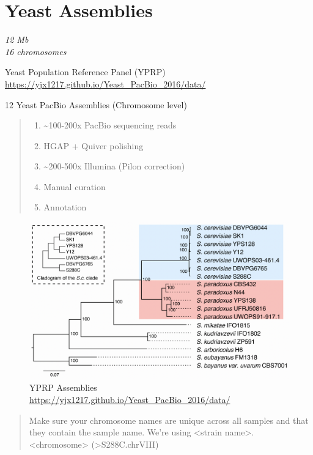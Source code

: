 \documentclass[
]{book}
\providecommand{\tightlist}{%
  \setlength{\itemsep}{0pt}\setlength{\parskip}{0pt}}
\begin{document}
\hypertarget{yeast-assemblies}{%
\section{Yeast Assemblies}\label{yeast-assemblies}}

\emph{12 Mb}\\
\emph{16 chromosomes}

Yeast Population Reference Panel (YPRP) \url{https://yjx1217.github.io/Yeast_PacBio_2016/data/}

12 Yeast PacBio Assemblies (Chromosome level)

\begin{quote}
\begin{enumerate}
\def\labelenumi{\arabic{enumi}.}
\tightlist
\item
  \textasciitilde100-200x PacBio sequencing reads
\item
  HGAP + Quiver polishing\\
\item
  \textasciitilde200-500x Illumina (Pilon correction)\\
\item
  Manual curation\\
\item
  Annotation
\end{enumerate}
\end{quote}

\begin{figure}
\centering
\includegraphics[width=1\textwidth,height=\textheight]{./Figures/Yeast.png}
\caption{YPRP Assemblies \url{https://yjx1217.github.io/Yeast_PacBio_2016/data/}}
\end{figure}

\begin{quote}
Make sure your chromosome names are unique across all samples and that they contain the sample name. We're using \textless strain name\textgreater.\textless chromosome\textgreater{} (\textgreater S288C.chrVIII)
\end{quote}
\end{document}
